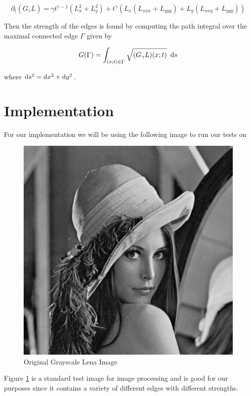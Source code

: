\documentclass{article}
\begin{document}
\begin{equation}
  \partial_t (G_{\gamma}L) = \gamma t^{\gamma-1}(L_x^2+L_y^2) + t^{\gamma}(L_x(L_{xxx}+L_{yyy})+L_y(L_{xxy} + L_{yyy}))
\end{equation}

Then the strength of the edges is found by computing the path integral over the maximal connected edge $\Gamma$ given by

\begin{equation}
  G(\Gamma) = \int_{(x;t) \in \Gamma} \sqrt{(G_{\gamma}L)(x;t)} \,\, \operatorname{d \!} s
\end{equation}

where $\operatorname{d \!} s^2=\operatorname{d \!} x^2+\operatorname{d \!} y^2$.

\section{Implementation}
For our implementation we will be using the following image to run our tests on

\begin{figure}[H]
  \centering
  \includegraphics[scale=0.5]{Images/lena.jpg}
  \caption{Original Grayscale Lena Image}
  \label{lena_o}
\end{figure}

Figure \ref{lena_o} is a standard test image for image processing and is good for our purposes since it contains a variety of different edges with different strengths.
\end{document}
